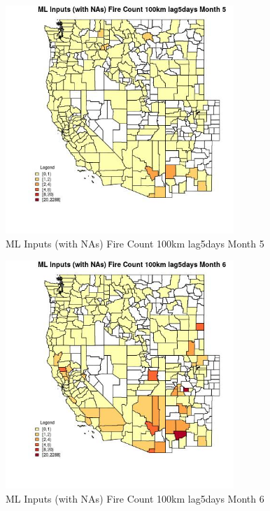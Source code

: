 \begin{figure} 
\centering  
\includegraphics[width=0.77\textwidth]{Code_Outputs/Report_ML_input_PM25_Step4_part_e_de_duplicated_aves_compiled_2019-05-20wNAs_CountyFire_Count_100km_lag5daysmedianMonth5.jpg} 
\caption{\label{fig:Report_ML_input_PM25_Step4_part_e_de_duplicated_aves_compiled_2019-05-20wNAsCountyFire_Count_100km_lag5daysmedianMonth5}ML Inputs (with NAs) Fire Count 100km lag5days Month 5} 
\end{figure} 
 

\begin{figure} 
\centering  
\includegraphics[width=0.77\textwidth]{Code_Outputs/Report_ML_input_PM25_Step4_part_e_de_duplicated_aves_compiled_2019-05-20wNAs_CountyFire_Count_100km_lag5daysmedianMonth6.jpg} 
\caption{\label{fig:Report_ML_input_PM25_Step4_part_e_de_duplicated_aves_compiled_2019-05-20wNAsCountyFire_Count_100km_lag5daysmedianMonth6}ML Inputs (with NAs) Fire Count 100km lag5days Month 6} 
\end{figure} 
 


